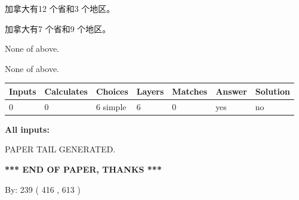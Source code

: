 \documentclass{ctexart}
\begin{document}
 
加拿大有12 个省和3 个地区。
 
 
加拿大有7 个省和9 个地区。
 
 
 None of above.
 
 
\noindent{}
 
 
 None of above.
 
 
\noindent{}
 
 
   
   
   
   
\noindent\begin{tabular}{|l|l|l|l|l|l|l|}
 \hline
Inputs & Calculates & Choices & Layers & Matches & Answer & Solution \\ \hline
 0  & 
 0  & 
 6
  simple  
  & 
 6  & 
 0  & 
  yes & 
  no 
  \\ \hline
 \end{tabular}
   
   
   
   
\noindent{}
   
   
   
   
\noindent\vspace{0.1in}\hspace{-0.08in} {\textbf{\Large{All inputs: }}}
   
   
   
   
   
   
 \vspace{0.2in}
 
   
   
\vspace{2.0in} PAPER TAIL GENERATED.
   
   
   
   
\vspace{1.0in} 
{\textbf{\large{ *** END OF PAPER, THANKS *** }}} 
   
   
\hspace{1.0in} By: 
 239 ( 416 ,  613 )
   
   
   
   
\newpage 
\setcounter{page}{ 
   462001 } 
   
   
   
\end{document}
